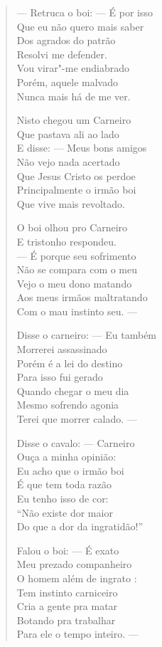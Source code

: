 \begin{verse}
---  Retruca o boi: ---  É por isso \\
Que eu não quero mais saber \\
Dos agrados do patrão \\
Resolvi me defender. \\
Vou virar"-me endiabrado \\
Porém, aquele malvado \\
Nunca mais há de me ver. 
\pagebreak

Nisto chegou um Carneiro \\
Que pastava ali ao lado \\
E disse: ---  Meus bons amigos \\
Não vejo nada acertado \\
Que Jesus Cristo os perdoe \\
Principalmente o irmão boi \\
Que vive mais revoltado. 

O boi olhou pro Carneiro \\
E tristonho respondeu. \\
---  É porque seu sofrimento \\
Não se compara com o meu \\
Vejo o meu dono matando \\
Aos meus irmãos maltratando \\
Com o mau instinto seu. ---

Disse o carneiro: ---  Eu também \\
Morrerei assassinado \\
Porém é a lei do destino \\
Para isso fui gerado \\
Quando chegar o meu dia \\
Mesmo sofrendo agonia \\
Terei que morrer calado. ---

Disse o cavalo: ---  Carneiro \\
Ouça a minha opinião: \\
Eu acho que o irmão boi \\
É que tem toda razão \\
Eu tenho isso de cor: \\
``Não existe dor maior \\
Do que a dor da ingratidão!'' 
\pagebreak

Falou o boi: ---  É exato \\
Meu prezado companheiro \\
O homem além de ingrato :\\
Tem instinto carniceiro \\
Cria a gente pra matar \\
Botando pra trabalhar \\
Para ele o tempo inteiro. ---


\end{verse}
